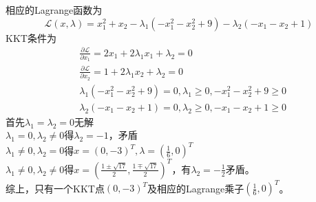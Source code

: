 	相应的Lagrange函数为
	\begin{equation*}
		\mathcal{L}(x,\lambda) = x_1^2+x_2 - \lambda_1 (-x_1^2-x_2^2+9) - \lambda_2 (-x_1-x_2+1)
	\end{equation*}
	KKT条件为
	\begin{equation*}
		\begin{split}
			&\frac{\partial\mathcal{L}}{\partial x_1} = 2x_1+2\lambda_1 x_1 +\lambda_2 = 0\\
			&\frac{\partial\mathcal{L}}{\partial x_2} = 1+2\lambda_1 x_2 +\lambda_2 = 0\\
			&\lambda_1 (-x_1^2-x_2^2+9) = 0, \lambda_1\geq 0, -x_1^2-x_2^2+9\geq 0\\
			&\lambda_2 (-x_1-x_2+1)  = 0, \lambda_2\geq 0, -x_1-x_2+1\geq 0
		\end{split}
	\end{equation*}
	首先$\lambda_1 = \lambda_2 = 0$无解\\
	$\lambda_1 = 0,\lambda_2 \neq 0$得$\lambda_2 = -1$，矛盾\\
	$\lambda_1\neq 0, \lambda_2 = 0$得$x = (0, -3)^T,\lambda = (\frac{1}{6},0)^T$\\
	$\lambda_1\neq 0, \lambda_2 \neq 0$得$x = (\frac{1\pm \sqrt{17}}{2},\frac{1\mp \sqrt{17}}{2})^T$，有$\lambda_2 = -\frac{1}{2}$矛盾。\\
	综上，只有一个KKT点$(0, -3)^T$及相应的Lagrange乘子$(\frac{1}{6}, 0)^T$。
